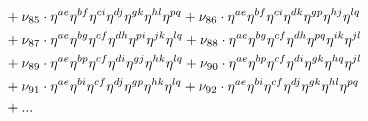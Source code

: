 \documentclass[a4paper,12pt, DIV=14, BCOR=5mm, twoside, headsepline, numbers=noenddot]{scrbook}
\begin{document}
\begin{align}
\begin{alignedat}{2}
& & &\hphantom{=}
+\nu_{85}\cdot\eta^{ae}\eta^{bf}\eta^{ci}\eta^{dj}\eta^{gk}\eta^{hl}\eta^{pq}+\nu_{86}\cdot\eta^{ae}\eta^{bf}\eta^{ci}\eta^{dk}\eta^{gp}\eta^{hj}\eta^{lq}\\
& & &\hphantom{=}
+\nu_{87}\cdot\eta^{ae}\eta^{bg}\eta^{cf}\eta^{dh}\eta^{pi}\eta^{jk}\eta^{lq}+\nu_{88}\cdot\eta^{ae}\eta^{bg}\eta^{cf}\eta^{dh}\eta^{pq}\eta^{ik}\eta^{jl}\\
& & &\hphantom{=}
+\nu_{89}\cdot\eta^{ae}\eta^{bp}\eta^{cf}\eta^{di}\eta^{gj}\eta^{hk}\eta^{lq}+\nu_{90}\cdot\eta^{ae}\eta^{bp}\eta^{cf}\eta^{di}\eta^{gk}\eta^{hq}\eta^{jl}\\
& & &\hphantom{=}
+\nu_{91}\cdot\eta^{ae}\eta^{bi}\eta^{cf}\eta^{dj}\eta^{gp}\eta^{hk}\eta^{lq}+\nu_{92}\cdot\eta^{ae}\eta^{bi}\eta^{cf}\eta^{dj}\eta^{gk}\eta^{hl}\eta^{pq}
\\
& & &\hphantom{=}+ \text{...}
\end{alignedat}
\end{align}
\end{document}
